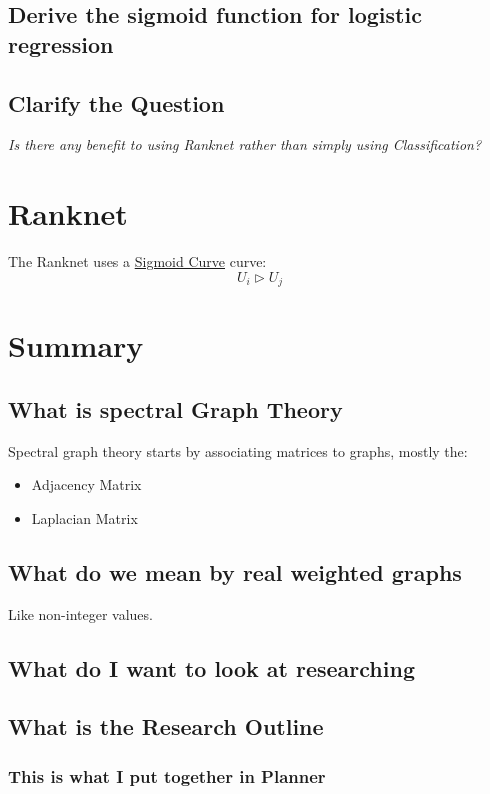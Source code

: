 \documentclass[a4paper,11pt,twoside]{article}
\begin{document}
\subsection{Derive the sigmoid function for logistic regression}
\label{sec:orga7f3d7f}

\subsection{Clarify the Question}
\label{sec:org608fb0c}
\emph{Is there any benefit to using Ranknet rather than simply using Classification?}
\section{Ranknet}
\label{sec:orgfbe0e61}
The Ranknet uses a \href{../../../Notes/Org/roam/20201204180427-sigmoid\_curve.org}{Sigmoid Curve} curve:
\[
U_{i} \triangleright U_{j}
\]
\section{Summary}
\label{sec:org577425f}
\subsection{What is spectral Graph Theory}
\label{sec:orgafe5d5d}
Spectral graph theory starts by associating matrices to graphs, mostly the:


\begin{itemize}
\item Adjacency Matrix
\item Laplacian Matrix
\end{itemize}

\subsection{What do we mean by real weighted graphs}
\label{sec:org3b949ac}
Like non-integer values.
\subsection{What do I want to look at researching}
\label{sec:orgf44e580}
\subsection{What is the Research Outline}
\label{sec:org10c9cc6}
\subsubsection{This is what I put together in Planner}
\label{sec:org1698b8c}
\end{document}
